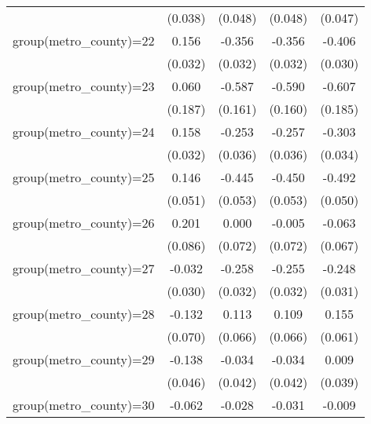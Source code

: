 {\begin{tabular}{l*{4}{c}}
                    &     (0.038)         &     (0.048)         &     (0.048)         &     (0.047)         \\
group(metro\_county)=22&       0.156\sym{***}&      -0.356\sym{***}&      -0.356\sym{***}&      -0.406\sym{***}\\
                    &     (0.032)         &     (0.032)         &     (0.032)         &     (0.030)         \\
group(metro\_county)=23&       0.060         &      -0.587\sym{***}&      -0.590\sym{***}&      -0.607\sym{***}\\
                    &     (0.187)         &     (0.161)         &     (0.160)         &     (0.185)         \\
group(metro\_county)=24&       0.158\sym{***}&      -0.253\sym{***}&      -0.257\sym{***}&      -0.303\sym{***}\\
                    &     (0.032)         &     (0.036)         &     (0.036)         &     (0.034)         \\
group(metro\_county)=25&       0.146\sym{***}&      -0.445\sym{***}&      -0.450\sym{***}&      -0.492\sym{***}\\
                    &     (0.051)         &     (0.053)         &     (0.053)         &     (0.050)         \\
group(metro\_county)=26&       0.201\sym{**} &       0.000         &      -0.005         &      -0.063         \\
                    &     (0.086)         &     (0.072)         &     (0.072)         &     (0.067)         \\
group(metro\_county)=27&      -0.032         &      -0.258\sym{***}&      -0.255\sym{***}&      -0.248\sym{***}\\
                    &     (0.030)         &     (0.032)         &     (0.032)         &     (0.031)         \\
group(metro\_county)=28&      -0.132\sym{*}  &       0.113\sym{*}  &       0.109\sym{*}  &       0.155\sym{**} \\
                    &     (0.070)         &     (0.066)         &     (0.066)         &     (0.061)         \\
group(metro\_county)=29&      -0.138\sym{***}&      -0.034         &      -0.034         &       0.009         \\
                    &     (0.046)         &     (0.042)         &     (0.042)         &     (0.039)         \\
group(metro\_county)=30&      -0.062         &      -0.028         &      -0.031         &      -0.009         \\

\end{tabular}}

